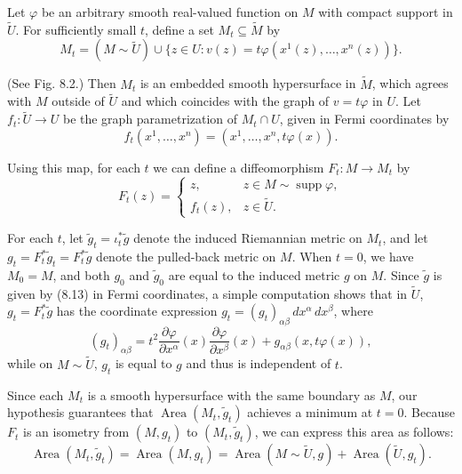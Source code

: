 
Let $\varphi$ be an arbitrary smooth real-valued function on $M$ with compact support in $\tilde{U}$. For sufficiently small $t$, define a set $M_t \subseteq \tilde{M}$ by
\[
M_t = (M \sim \tilde{U}) \cup \{z \in U : v(z) = t\varphi(x^1(z), \ldots, x^n(z))\}.
\]

(See Fig. 8.2.) Then $M_t$ is an embedded smooth hypersurface in $\tilde{M}$, which agrees with $M$ outside of $\tilde{U}$ and which coincides with the graph of $v = t\varphi$ in $U$. Let $f_t : \tilde{U} \to U$ be the graph parametrization of $M_t \cap U$, given in Fermi coordinates by
\[
f_t(x^1, \ldots, x^n) = (x^1, \ldots, x^n, t\varphi(x)).
\]

Using this map, for each $t$ we can define a diffeomorphism $F_t : M \to M_t$ by
\[
F_t(z) = \begin{cases} z, & z \in M \sim \operatorname{supp} \varphi, \\ f_t(z), & z \in \tilde{U}. \end{cases}
\]

For each $t$, let $\tilde{g}_t = \iota_t^* \tilde{g}$ denote the induced Riemannian metric on $M_t$, and let $g_t = F_t^* \tilde{g}_t = F_t^* \tilde{g}$ denote the pulled-back metric on $M$. When $t = 0$, we have $M_0 = M$, and both $g_0$ and $\tilde{g}_0$ are equal to the induced metric $g$ on $M$. Since $\tilde{g}$ is given by (8.13) in Fermi coordinates, a simple computation shows that in $\tilde{U}$, $g_t = F_t^* \tilde{g}$ has the coordinate expression $g_t = (g_t)_{\alpha\beta} \, dx^\alpha \, dx^\beta$, where
\begin{equation}
(g_t)_{\alpha\beta} = t^2 \frac{\partial \varphi}{\partial x^\alpha}(x) \frac{\partial \varphi}{\partial x^\beta}(x) + g_{\alpha\beta}(x, t\varphi(x)),
\tag{8.15}
\end{equation}
while on $M \sim \tilde{U}$, $g_t$ is equal to $g$ and thus is independent of $t$.

Since each $M_t$ is a smooth hypersurface with the same boundary as $M$, our hypothesis guarantees that $\operatorname{Area}(M_t, \tilde{g}_t)$ achieves a minimum at $t = 0$. Because $F_t$ is an isometry from $(M, g_t)$ to $(M_t, \tilde{g}_t)$, we can express this area as follows:
\[
\operatorname{Area}(M_t, \tilde{g}_t) = \operatorname{Area}(M, g_t) = \operatorname{Area}(M \sim \tilde{U}, g) + \operatorname{Area}(\tilde{U}, g_t).
\]

